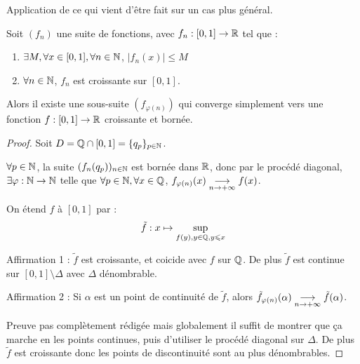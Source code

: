 \begin{exemple}
    Application de ce qui vient d'être fait sur un cas plus général. 

    Soit $(f_n)$ une suite de fonctions, avec $f_n : [0, 1] \to \mathbb{R}$ tel que : 
    \begin{enumerate}
        \item $\exists M, \forall x \in [0, 1], \forall n \in \mathbb{N}$, $|f_n(x)| \leqslant M$ 
        \item $\forall n \in \mathbb{N}$, $f_n$ est croissante sur $[0, 1]$.
    \end{enumerate}

    Alors il existe une sous-suite $(f_{\varphi(n)})$ qui converge simplement vers une fonction $f : [0, 1] \to \mathbb{R}$ croissante et bornée.

    \begin{proof}
        Soit $D = \mathbb{Q} \cap [0, 1] = \{q_p\}_{p \in \mathbb{N}}$.

        $\forall p \in \mathbb{N}$, la suite $(f_n(q_p))_{n \in \mathbb{N}}$ est bornée dans $\mathbb{R}$, donc par le procédé diagonal,
        $\exists \varphi : \mathbb{N} \to \mathbb{N}$ telle que $\forall p \in \mathbb{N}, \forall x \in \mathbb{Q}$, $f_{\varphi(n)}(x) \underset{n \to + \infty}{\longrightarrow} f(x)$.

        On étend $f$ à $[0, 1]$ par : 
        \[    \tilde f : x \mapsto \sup_{f(y), y \in \mathbb{Q}, y \leqslant x} \]

        \lvspace Affirmation 1 : $\tilde f$ est croissante, et coicide avec $f$ sur $\mathbb{Q}$. De plus $\tilde f$ est continue sur $[0, 1] \setminus \Delta$
        avec $\Delta$ dénombrable.

        \lvspace Affirmation 2 : Si $\alpha$ est un point de continuité de $\tilde f$, alors $\tilde f_{\varphi(n)}(\alpha) \underset{n \to + \infty}{\longrightarrow} \tilde f(\alpha)$.

        Preuve pas complètement rédigée mais globalement il suffit de montrer que ça marche en les points continues, puis 
        d'utiliser le procédé diagonal sur $\Delta$. De plus $\tilde f$ est croissante donc les points de discontinuité sont au plus dénombrables.
    \end{proof}
\end{exemple}

